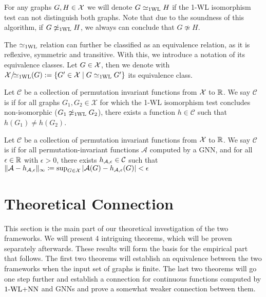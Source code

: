 \begin{definition}[1-WL Relation]
    For any graphs $G,H \in \mathcal{X}$ we will denote $G \simeq_{\text{1WL}} H$ if the 1-WL isomorphism test can not distinguish both graphs. Note that due to the soundness of this algorithm, if $G \not\simeq_{\text{1WL}} H$, we always can conclude that $G \not\simeq H$.
\end{definition}

The $\simeq_{\text{1WL}}$ relation can further be classified as an equivalence relation, as it is reflexive, symmetric and transitive. With this, we introduce a notation of its equivalence classes. Let $G \in \mathcal{X}$, then we denote with $\mathcal{X}/\!{\simeq_{\text{1WL}}}(G): = \{ G' \in \mathcal{X} \mid G \simeq_{\text{1WL}} G' \}$ its equivalence class.

\begin{definition}[$\wldisc$]
    Let $\mathcal{C}$ be a collection of permutation invariant functions from $\mathcal{X}$ to $\mathbb{R}$. We say $\mathcal{C}$ is \textbf{\wldisc} if for all graphs $G_1, G_2 \in \mathcal{X}$ for which the 1-WL isomorphism test concludes non-isomorphic ($G_1 \not\simeq_{\text{1WL}} G_2$), there exists a function $h \in \mathcal{C}$ such that $h(G_1) \neq h(G_2)$.
\end{definition}

\begin{definition}[$\gapp$]
    Let $\mathcal{C}$ be a collection of permutation invariant functions from $\mathcal{X}$ to $\mathbb{R}$. We say $\mathcal{C}$ is \textbf{\gapp} if for all permutation-invariant functions $\mathcal{A}$ computed by a GNN, and for all $\epsilon \in \mathbb{R}$ with $\epsilon > 0$, there exists $h_{\mathcal{A},\epsilon} \in \mathcal{C}$ such that $\| \mathcal{A} - h_{\mathcal{A},\epsilon} \|_\infty \coloneqq \sup_{G \in \mathcal{X}} |\mathcal{A}(G) - h_{\mathcal{A},\epsilon}(G)| < \epsilon$
\end{definition}

\section{Theoretical Connection}
This section is the main part of our theoretical investigation of the two frameworks. We will present 4 intriguing theorems, which will be proven separately afterwards. These results will form the basis for the empirical part that follows. The first two theorems will establish an equivalence between the two frameworks when the input set of graphs is finite. The last two theorems will go one step further and establish a connection for continuous functions computed by $\text{1-WL+NN}$ and GNNs and prove a somewhat weaker connection between them.

